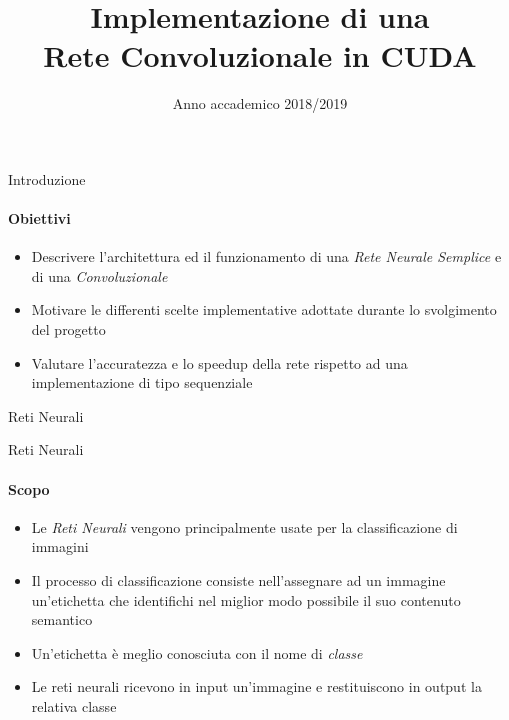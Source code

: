 \documentclass[
 ]{beamer}
\author {
            \hspace*{0.01em}{\Large Michele Valsesia}
        }
\begin{document}

\title{Implementazione di una \\ 
       Rete Convoluzionale in CUDA \bigskip}
        
\date{\Large Anno accademico 2018/2019}


     
\begin{frame}
\maketitle
\end{frame}



\begin{frame}{Introduzione}
    \framesubtitle{Obiettivi}  
    
    \begin{itemize} [<+->]
        \setlength\itemsep{3em}
        \item \large Descrivere l'architettura ed il funzionamento di una \emph{Rete Neurale Semplice} e di una \emph{Convoluzionale}
        \item \large Motivare le differenti scelte implementative adottate durante lo svolgimento del progetto
        \item \large Valutare l'accuratezza e lo speedup della rete rispetto ad una implementazione di tipo sequenziale       
    \end{itemize}  
\end{frame}



\begin{frame}[c]
  \centering
  \bigskip \bigskip    
  \Huge Reti Neurali
\end{frame}

\begin{frame}{Reti Neurali}
    \framesubtitle{Scopo}
    \begin{itemize} [<+->]
        \setlength\itemsep{2em}
        \item \large Le \emph{Reti Neurali} vengono principalmente usate per la classificazione di immagini
       \item \large Il processo di classificazione consiste nell'assegnare ad un immagine un'etichetta che identifichi nel miglior modo possibile il suo contenuto semantico
       \item \large Un'etichetta è meglio conosciuta con il nome di \emph{classe}
       \item \large Le reti neurali ricevono in input un'immagine e restituiscono in output la relativa classe 
    \end{itemize}
\end{frame} 
\end{document}
